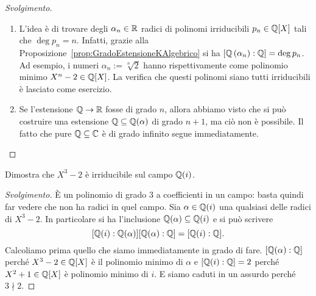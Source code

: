 \begin{proof}[Svolgimento]
\begin{enumerate}
\item L'idea è di trovare degli \(\alpha_n \in \mathbb{R}\) radici di polinomi irriducibili \(p_n \in \mathbb{Q}[X]\) tali che \(\deg p_n = n\). Infatti, grazie alla Proposizione~\ref{prop:GradoEstensioneKAlgebrico} si ha \([\mathbb{Q}\left(\alpha_n\right) : \mathbb{Q}] = \deg p_n\). Ad esempio, i numeri \(\alpha_n := \sqrt[n]{2}\) hanno rispettivamente come polinomio minimo \(X^n-2 \in \mathbb{Q}[X]\). La verifica che questi polinomi siano tutti irriducibili è lasciato come esercizio.
\item Se l'estensione \(\mathbb{Q} \to \mathbb{R}\) fosse di grado \(n\), allora abbiamo visto che si può costruire una estensione \(\mathbb{Q} \subseteq \mathbb{Q}(\alpha)\) di grado \(n+1\), ma ciò non è possibile. Il fatto che pure \(\mathbb{Q} \subseteq \mathbb{C}\) è di grado infinito segue immediatamente. \qedhere
\end{enumerate}
\end{proof}

\begin{eser}[\tsumura{399}]
Dimostra che \(X^3-2\) è irriducibile sul campo \(\mathbb{Q}(i)\).
\end{eser}

\begin{proof}[Svolgimento]
È un polinomio di grado \(3\) a coefficienti in un campo: basta quindi far vedere che non ha radici in quel campo. Sia \(\alpha \in \mathbb{Q}(i)\) una qualsiasi delle radici di \(X^3-2\). In particolare si ha l'inclusione \(\mathbb{Q}(\alpha) \subseteq \mathbb{Q}(i)\) e si può scrivere
\[[\mathbb{Q}(i):\mathbb{Q}(\alpha)][\mathbb{Q}(\alpha):\mathbb{Q}] = [\mathbb{Q}(i):\mathbb{Q}] .\]
Calcoliamo prima quello che siamo immediatamente in grado di fare. \([\mathbb{Q}(\alpha):\mathbb{Q}]\) perché \(X^3-2 \in \mathbb{Q}[X]\) è il polinomio minimo di \(\alpha\) e \([\mathbb{Q}(i):\mathbb{Q}] = 2\) perché \(X^2+1 \in \mathbb{Q}[X]\) è polinomio minimo di \(i\). E siamo caduti in un assurdo perché \(3 \nmid 2\). 
\end{proof}

